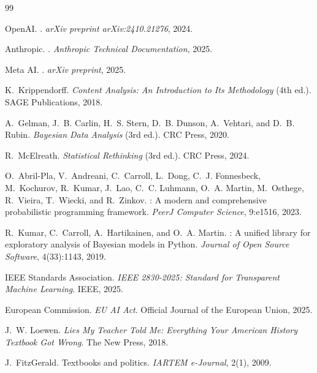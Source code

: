\documentclass[10pt,letterpaper]{article}
\begin{document}

\begin{thebibliography}{99}

OpenAI.
.
\newblock \emph{arXiv preprint arXiv:2410.21276}, 2024.

Anthropic.
.
\newblock \emph{Anthropic Technical Documentation}, 2025.

Meta AI.
.
\newblock \emph{arXiv preprint}, 2025.

K.~Krippendorff.
\newblock \emph{Content Analysis: An Introduction to Its Methodology} (4th
  ed.).
\newblock SAGE Publications, 2018.

A.~Gelman, J.~B. Carlin, H.~S. Stern, D.~B. Dunson, A.~Vehtari, and
  D.~B. Rubin.
\newblock \emph{Bayesian Data Analysis} (3rd ed.).
\newblock CRC Press, 2020.

R.~McElreath.
\newblock \emph{Statistical Rethinking} (3rd ed.).
\newblock CRC Press, 2024.

O.~Abril-Pla, V.~Andreani, C.~Carroll, L.~Dong, C.~J. Fonnesbeck,
  M.~Kochurov, R.~Kumar, J.~Lao, C.~C. Luhmann, O.~A. Martin,
  M.~Osthege, R.~Vieira, T.~Wiecki, and R.~Zinkov.
: A modern and comprehensive probabilistic programming
  framework.
\newblock \emph{PeerJ Computer Science}, 9:e1516, 2023.

R.~Kumar, C.~Carroll, A.~Hartikainen, and O.~A. Martin.
: A unified library for exploratory analysis of Bayesian
  models in {Python}.
\newblock \emph{Journal of Open Source Software}, 4(33):1143, 2019.

IEEE Standards Association.
\newblock \emph{IEEE 2830-2025: Standard for Transparent Machine Learning}.
\newblock IEEE, 2025.

European Commission.
\newblock \emph{EU AI Act}.
\newblock Official Journal of the European Union, 2025.

J.~W. Loewen.
\newblock \emph{Lies My Teacher Told Me: Everything Your American History
  Textbook Got Wrong}.
\newblock The New Press, 2018.

J.~FitzGerald.
\newblock Textbooks and politics.
\newblock \emph{IARTEM e-Journal}, 2(1), 2009.

\end{thebibliography}
\end{document}
